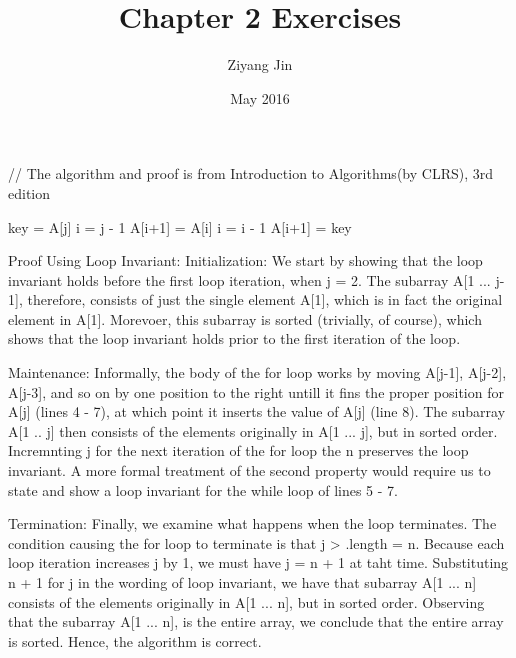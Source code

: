 \documentclass{article}
\title{Chapter 2 Exercises}
\author{Ziyang Jin}
\date{May 2016}
\begin{document}
// The algorithm and proof is from Introduction to Algorithms(by CLRS), 3rd edition\par
\begin{algorithm}
\begin{algorithmic}[1]
    \State key = A[j]
    \State i = j - 1
      \State A[i+1] = A[i]
      \State i = i - 1
    \EndWhile
    \State A[i+1] = key
\EndProcedure
\end{algorithmic}
\end{algorithm}

Proof Using Loop Invariant:
  Initialization: We start by showing that the loop invariant holds before the first loop iteration, when j = 2. The subarray A[1 ... j-1], therefore, consists of just the single element A[1], which is in fact the original element in A[1]. Morevoer, this subarray is sorted (trivially, of course), which shows that the loop invariant holds prior to the first iteration of the loop.
  
  Maintenance: Informally, the body of the for loop works by moving A[j-1], A[j-2], A[j-3], and so on by one position to the right untill it fins the proper position for A[j] (lines 4 - 7), at which point it inserts the value of A[j] (line 8). The subarray A[1 .. j] then consists of the elements originally in A[1 ... j], but in sorted order. Incremnting j for the next iteration of the for loop the n preserves the loop invariant.
    A more formal treatment of the second property would require us to state and show a loop invariant for the while loop of lines 5 - 7.
  
  Termination: Finally, we examine what happens when the loop terminates. The condition causing the for loop to terminate is that j > .length = n. Because each loop iteration increases j by 1, we must have j = n + 1 at taht time. Substituting n + 1 for j in the wording of loop invariant, we have that subarray A[1 ... n] consists of the elements originally in A[1 ... n], but in sorted order. Observing that the subarray A[1 ... n], is the entire array, we conclude that the entire array is sorted. Hence, the algorithm is correct.
  
\end{document}
